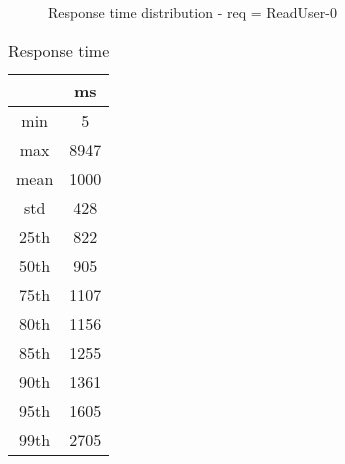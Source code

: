 \begin{minipage}{0.75\linewidth}
\begin{figure}[h]
\begin{adjustbox}{max width=1.0\linewidth, keepaspectratio}
  \end{adjustbox}
  \caption{Response time distribution - req = ReadUser-0}
\end{figure}
\end{minipage}\hfill\begin{minipage}{0.18\linewidth}
\begin{table}[h]
\begin{tabular}{|cc|}
\hline
\textbf{} & \textbf{ms}\\ \hline
 \Xhline{0.005\arrayrulewidth}
min & 5\\
 \Xhline{0.005\arrayrulewidth}
max & 8947\\
 \Xhline{0.005\arrayrulewidth}
mean & 1000\\
 \Xhline{0.005\arrayrulewidth}
std & 428\\
\hline
\hline
 \Xhline{0.005\arrayrulewidth}
25th & 822\\
 \Xhline{0.005\arrayrulewidth}
50th & 905\\
 \Xhline{0.005\arrayrulewidth}
75th & 1107\\
 \Xhline{0.005\arrayrulewidth}
80th & 1156\\
 \Xhline{0.005\arrayrulewidth}
85th & 1255\\
 \Xhline{0.005\arrayrulewidth}
90th & 1361\\
 \Xhline{0.005\arrayrulewidth}
95th & 1605\\
 \Xhline{0.005\arrayrulewidth}
99th & 2705\\
\hline
\end{tabular}
\caption{Response time}
\end{table}
\end{minipage}\hfill